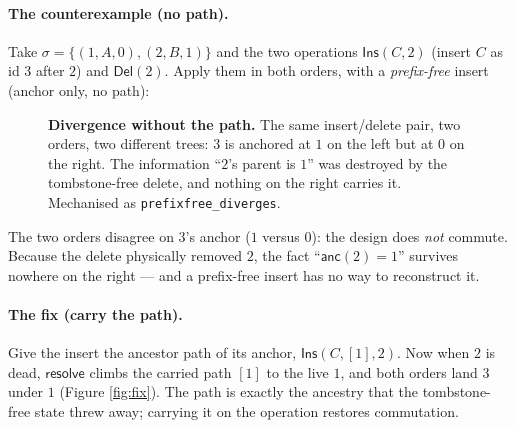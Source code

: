 \documentclass[11pt]{article}
\newcommand{\anc}{\mathsf{anc}}
\newcommand{\resolve}{\mathsf{resolve}}
\newcommand{\Ins}{\mathsf{Ins}}
\newcommand{\Del}{\mathsf{Del}}
\begin{document}
\paragraph{The counterexample (no path).} Take $\sigma=\{(1,A,0),(2,B,1)\}$ and the
two operations $\Ins(C, 2)$ (insert $C$ as id $3$ after $2$) and $\Del(2)$. Apply
them in both orders, with a \emph{prefix-free} insert (anchor only, no path):

\begin{figure}[h]
\centering
{}
\caption{\textbf{Divergence without the path.} The same insert/delete pair, two
orders, two different trees: $3$ is anchored at $1$ on the left but at $0$ on the
right. The information ``$2$'s parent is $1$'' was destroyed by the tombstone-free
delete, and nothing on the right carries it. Mechanised as
\texttt{prefixfree\_diverges}.}
\label{fig:diverge}
\end{figure}

The two orders disagree on $3$'s anchor ($1$ versus $0$): the design does
\emph{not} commute. Because the delete physically removed $2$, the fact
``$\anc(2)=1$'' survives nowhere on the right --- and a prefix-free insert has no
way to reconstruct it.

\paragraph{The fix (carry the path).} Give the insert the ancestor path of its
anchor, $\Ins(C, [1], 2)$. Now when $2$ is dead, $\resolve$ climbs the carried
path $[1]$ to the live $1$, and both orders land $3$ under $1$ (Figure
\ref{fig:fix}). The path is exactly the ancestry that the tombstone-free state
threw away; carrying it on the operation restores commutation.
\end{document}
